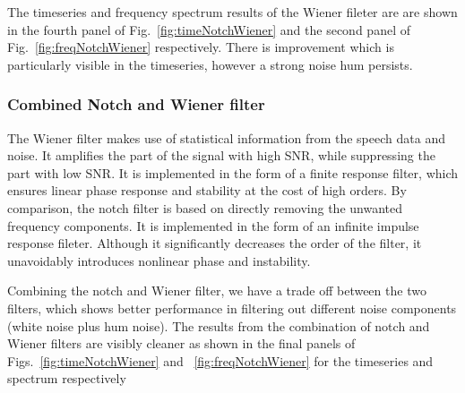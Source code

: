\documentclass[paper-main.tex]{subfiles}
\begin{document}
The timeseries and frequency spectrum results of the Wiener fileter are are shown in the fourth panel of Fig.~\ref{fig:timeNotchWiener} and the second panel of Fig.~\ref{fig:freqNotchWiener} respectively. 
There is improvement which is particularly visible in the timeseries, however a strong noise hum persists. 


\subsubsection{Combined Notch and Wiener filter}
The Wiener filter makes use of statistical information from the speech data and noise. 
It amplifies the part of the signal with high SNR, while suppressing the part with low SNR. 
It is implemented in the form of a finite response filter, which ensures linear phase response and stability at the cost of high orders. 
By comparison, the notch filter is based on directly removing the unwanted frequency components. 
It is implemented in the form of an infinite impulse response fileter. 
Although it significantly decreases the order of the filter, it unavoidably introduces nonlinear phase and instability. 

Combining the notch and Wiener filter, we have a trade off between the two filters, which shows better performance in filtering out different noise components (white noise plus hum noise). 
The results from the combination of notch and Wiener filters are visibly cleaner as shown in the final panels of Figs.~\ref{fig:timeNotchWiener} and ~\ref{fig:freqNotchWiener} for the timeseries and spectrum respectively 




\end{document}
